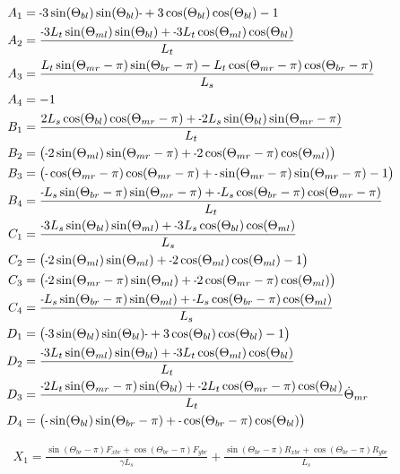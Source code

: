 \documentclass[11pt, landscape]{article}
\newcommand{\mn}{\scalebox{0.7}[1.0]{-}}
\begin{document}
\begin{align}
  A_1 &= \mn 3\sin(\Theta_{bl})\sin(\Theta_{bl})\mn + 3\cos(\Theta_{bl})\cos(\Theta_{bl}) -1 \\
  A_2 &= \frac{\mn 3L_{t}\sin(\Theta_{ml})\sin(\Theta_{bl}) + \mn 3L_{t}\cos(\Theta_{ml})\cos(\Theta_{bl})}{L_t} \\
  A_3 &= \frac{L_{t}\sin(\Theta_{mr}-\pi)\sin(\Theta_{br}-\pi) - L_{t}\cos(\Theta_{mr}-\pi)\cos(\Theta_{br}-\pi)}{L_{s}} \\
  A_4 &= -1 \\
  B_1 &= \frac{2L_{s}\cos(\Theta_{bl})\cos(\Theta_{mr}-\pi) + \mn 2L_{s}\sin(\Theta_{bl})\sin(\Theta_{mr}-\pi)}{L_{t}} \\
  B_2 &= \big(\mn 2\sin(\Theta_{ml})\sin(\Theta_{mr}-\pi) + \mn 2\cos(\Theta_{mr}-\pi)\cos(\Theta_{ml}) \big) \\
  B_3 &= \big( \mn \cos(\Theta_{mr}-\pi)\cos(\Theta_{mr}-\pi) + \mn\sin(\Theta_{mr}-\pi)\sin(\Theta_{mr}-\pi) - 1\big) \\
  B_4 &= \frac{\mn L_{s}\sin(\Theta_{br}-\pi)\sin(\Theta_{mr}-\pi) + \mn L_{s}\cos(\Theta_{br}-\pi)\cos(\Theta_{mr}-\pi)}{L_{t}} \\
  C_1 &= \frac{\mn 3L_{s}\sin(\Theta_{bl})\sin(\Theta_{ml}) + \mn3L_{s}\cos(\Theta_{bl})\cos(\Theta_{ml})}{L_s} \\
  C_2 &= \big(\mn 2\sin(\Theta_{ml})\sin(\Theta_{ml}) + \mn 2\cos(\Theta_{ml})\cos(\Theta_{ml}) - 1\big) \\
  C_3 &= \big(\mn 2\sin(\Theta_{mr}-\pi)\sin(\Theta_{ml}) + \mn 2\cos(\Theta_{mr}-\pi)\cos(\Theta_{ml}) \big) \\
  C_4 &= \frac{\mn L_{s}\sin(\Theta_{br}-\pi)\sin(\Theta_{ml}) + \mn L_{s}\cos(\Theta_{br}-\pi)\cos(\Theta_{ml})}{L_s} \\
  D_1 &= \big(\mn 3\sin(\Theta_{bl})\sin(\Theta_{bl})\mn + 3\cos(\Theta_{bl})\cos(\Theta_{bl}) -1\big) \\
  D_2 &= \frac{\mn 3L_{t}\sin(\Theta_{ml})\sin(\Theta_{bl}) + \mn 3L_{t}\cos(\Theta_{ml})\cos(\Theta_{bl})}{L_t} \\
  D_3 &= \frac{\mn 2L_{t}\sin(\Theta_{mr}-\pi)\sin(\Theta_{bl}) + \mn 2L_{t}\cos(\Theta_{mr}-\pi)\cos(\Theta_{bl})}{L_t}\dot{\Theta}_{mr} \\
  D_4 &= \big(\mn \sin(\Theta_{bl}) \sin(\Theta_{br}-\pi) + \mn \cos(\Theta_{br}-\pi)\cos(\Theta_{bl})\big) \\
\end{align}

\begin{multline}
  X_1 = \frac{\sin(\Theta_{br}-\pi)F_{xbr} + \cos(\Theta_{br}-\pi)F_{ybr}}{\gamma L_{s}} + \frac{\sin(\Theta_{br}-\pi)R_{xbr} + \cos(\Theta_{br}-\pi)R_{ybr}}{L_{s}} \\
\end{multline}
\end{document}
